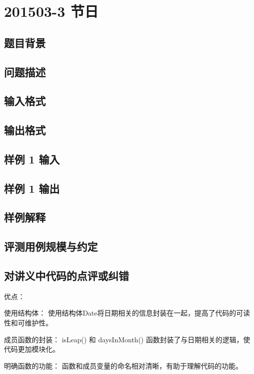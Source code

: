 \section{201503-3 节日}

\subsection{题目背景}

\subsection{问题描述}

\subsection{输入格式}

\subsection{输出格式}

\subsection{样例 1 输入}

\subsection{样例 1 输出}

\subsection{样例解释}

\subsection{评测用例规模与约定}

\subsection{对讲义中代码的点评或纠错}
 
优点：

使用结构体： 使用结构体Date将日期相关的信息封装在一起，提高了代码的可读性和可维护性。

成员函数的封装： isLeap() 和 daysInMonth() 函数封装了与日期相关的逻辑，使代码更加模块化。

明确函数的功能： 函数和成员变量的命名相对清晰，有助于理解代码的功能。

